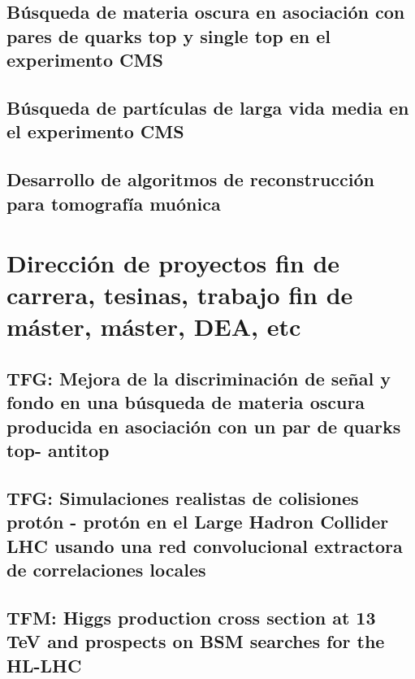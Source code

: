 \documentclass[a4paper, 11pt, twoside, openright]{report}
\begin{document}
\subsection{Búsqueda de materia oscura en asociación con pares de quarks top y single top en el experimento CMS}


\subsection{Búsqueda de partículas de larga vida media en el experimento CMS}


\subsection{Desarrollo de algoritmos de reconstrucción para tomografía muónica}



\section{Dirección de proyectos fin de carrera, tesinas, trabajo fin de máster, máster, DEA, etc}

\subsection{TFG: Mejora de la discriminación de señal y fondo en una búsqueda de materia oscura producida en asociación con un par de quarks top- antitop}


\subsection{TFG: Simulaciones realistas de colisiones protón - protón en el Large Hadron Collider LHC usando una red convolucional extractora de correlaciones locales}


\subsection{TFM: Higgs production cross section at 13 TeV and prospects on BSM searches for the HL-LHC}

\end{document}
